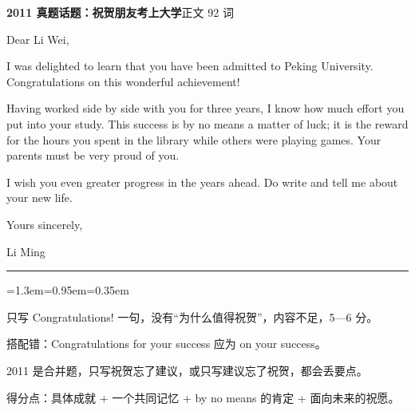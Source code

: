 \documentclass[10pt,a4paper]{ctexart}
\begin{document}
\vspace{2pt}\noindent\colorbox{soft}{\parbox{\dimexpr\linewidth-2\fboxsep\relax}{%
\vspace{2pt}
{\footnotesize\bfseries\color{accent}2011 真题话题：祝贺朋友考上大学}\hfill{\footnotesize\color{gray}正文 92 词}
\par\vspace{2pt}
\footnotesize Dear Li Wei,\par
\footnotesize I was delighted to learn that you have been admitted to Peking University. Congratulations on this wonderful achievement!\par
\footnotesize Having worked side by side with you for three years, I know how much effort you put into your study. This success is by no means a matter of luck; it is the reward for the hours you spent in the library while others were playing games. Your parents must be very proud of you.\par
\footnotesize I wish you even greater progress in the years ahead. Do write and tell me about your new life.\par
\footnotesize Yours sincerely,\par
\footnotesize Li Ming\par
\par{}
\par\vspace{1pt}}}\par
\vspace{2pt}
\vspace{4pt}\par\nopagebreak
{\color{rule}\rule{\linewidth}{0.6pt}}\par\nopagebreak
\vspace{1pt}
\vspace{1pt}\begingroup\setlength{\parindent}{0pt}
\begin{list}{}{\leftmargin=1.3em=0.95em=0.35em\itemindent=0pt\topsep=0pt\partopsep=0pt\parsep=1.5pt\itemsep=0pt}
\item[{\color{warn}\scriptsize$\blacksquare$}]{\footnotesize 只写 Congratulations! 一句，没有“为什么值得祝贺”，内容不足，5—6 分。}
\item[{\color{warn}\scriptsize$\blacksquare$}]{\footnotesize 搭配错：Congratulations for your success 应为 on your success。}
\item[{\color{warn}\scriptsize$\blacksquare$}]{\footnotesize 2011 是合并题，只写祝贺忘了建议，或只写建议忘了祝贺，都会丢要点。}
\item[{\color{warn}\scriptsize$\blacksquare$}]{\footnotesize 得分点：具体成就 + 一个共同记忆 + by no means 的肯定 + 面向未来的祝愿。}
\end{list}
\end{document}
